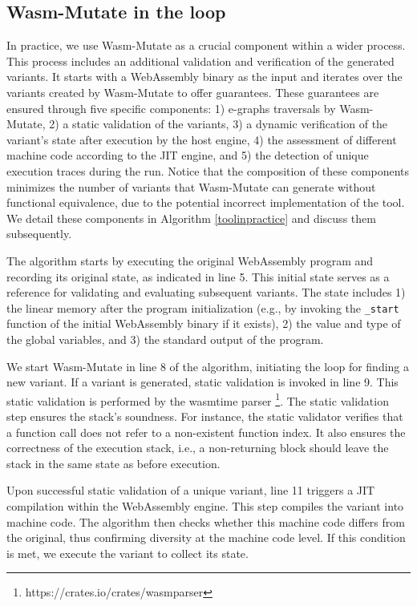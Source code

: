 \documentclass[a4paper,fleqn]{cas-dc}
\newcommand{\tool}{{\sc Wasm-Mutate}\xspace}
\newcommand{\Wasm}{WebAssembly\xspace}
\newcommand{\wasm}{\Wasm}
\newenvironment{revision1}{\color{blue}}{}
\begin{document}
\begin{revision1}
    
\subsection{\tool in the loop}
In practice, we use \tool as a crucial component within a wider process. 
This process includes an additional validation and verification of the generated variants. 
It starts with a \wasm binary as the input and iterates over the variants created by \tool to offer guarantees. 
These guarantees are ensured through five specific components: 1) e-graphs traversals by \tool, 2) a static validation of the variants, 3) a dynamic verification of the variant's state after execution by the host engine, 4) the assessment of different machine code according to the JIT engine, and 5) the detection of unique execution traces during the run. 
Notice that the composition of these components minimizes the number of variants that \tool can generate without functional equivalence, due to the potential incorrect implementation of the tool. 
We detail these components in Algorithm \autoref{toolinpractice} and discuss them subsequently.



The algorithm starts by executing the original \wasm program and recording its original state, as indicated in line 5.
This initial state serves as a reference for validating and evaluating subsequent variants.
The state includes 1) the linear memory after the program initialization (e.g., by invoking the \texttt{_start} function of the initial \wasm binary if it exists), 2) the value and type of the global variables, and 3) the standard output of the program.


We start \tool in line 8 of the algorithm, initiating the loop for finding a new variant.
If a variant is generated, static validation is invoked in line 9.
This static validation is performed by the wasmtime parser \footnote{https://crates.io/crates/wasmparser}.
The static validation step ensures the stack's soundness.
For instance, the static validator verifies that a function call does not refer to a non-existent function index.
It also ensures the correctness of the execution stack, i.e., a non-returning block should leave the stack in the same state as before execution.

Upon successful static validation of a unique variant, line 11 triggers a JIT compilation within the \wasm engine.
This step compiles the variant into machine code.
The algorithm then checks whether this machine code differs from the original, thus confirming diversity at the machine code level.
If this condition is met, we execute the variant to collect its state.


\end{revision1}
\end{document}
